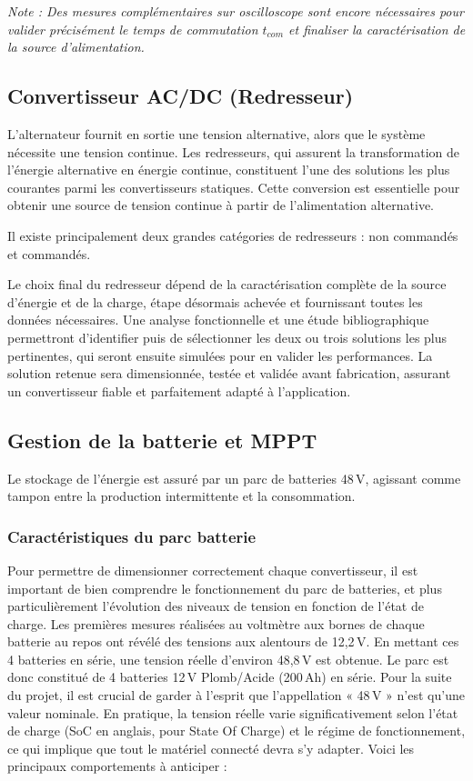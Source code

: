 \textit{Note : Des mesures complémentaires sur oscilloscope sont encore nécessaires pour valider précisément le temps de commutation $t_{com}$ et finaliser la caractérisation de la source d’alimentation.}

\subsection{Convertisseur AC/DC (Redresseur)}
L'alternateur fournit en sortie une tension alternative, alors que le système nécessite une tension continue. Les redresseurs, qui assurent la transformation de l'énergie alternative en énergie continue, constituent l'une des solutions les plus courantes parmi les convertisseurs statiques. Cette conversion est essentielle pour obtenir une source de tension continue à partir de l'alimentation alternative.

Il existe principalement deux grandes catégories de redresseurs : non commandés et commandés.

Le choix final du redresseur dépend de la caractérisation complète de la source d'énergie et de la charge, étape désormais achevée et fournissant toutes les données nécessaires. Une analyse fonctionnelle et une étude bibliographique permettront d'identifier puis de sélectionner les deux ou trois solutions les plus pertinentes, qui seront ensuite simulées pour en valider les performances. La solution retenue sera dimensionnée, testée et validée avant fabrication, assurant un convertisseur fiable et parfaitement adapté à l'application.

\subsection{Gestion de la batterie et MPPT}
\label{sec:gestion_batterie}

Le stockage de l'énergie est assuré par un parc de batteries 48\,V, agissant comme tampon entre la production intermittente et la consommation.

\subsubsection{Caractéristiques du parc batterie}
Pour permettre de dimensionner correctement chaque convertisseur, il est important de bien comprendre le fonctionnement du parc de batteries, et plus particulièrement l'évolution des niveaux de tension en fonction de l'état de charge.
Les premières mesures réalisées au voltmètre aux bornes de chaque batterie au repos ont révélé des tensions aux alentours de 12,2\,V. En mettant ces 4 batteries en série, une tension réelle d'environ 48,8\,V est obtenue.
Le parc est donc constitué de 4 batteries 12\,V Plomb/Acide (200\,Ah) en série. Pour la suite du projet, il est crucial de garder à l'esprit que l'appellation « 48\,V » n'est qu'une valeur nominale. En pratique, la tension réelle varie significativement selon l'état de charge (SoC en anglais, pour State Of Charge) et le régime de fonctionnement, ce qui implique que tout le matériel connecté devra s'y adapter. Voici les principaux comportements à anticiper :

